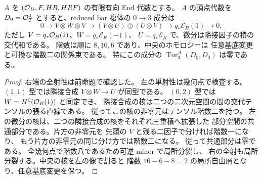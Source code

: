 \begin{proposition}[鉛筆窓の最長成分の関係束]
$A$ を $(\mathcal O_D,F,HR,HRF)$ の有限有向 End 代数とする。
$A$ の頂点代数を $D_0=\mathcal O_T^4$ とすると、reduced bar 複体の
$0\to3$ 成分は
\[
 0\longrightarrow V\otimes W\otimes V
 \longrightarrow (V\otimes U)\oplus(U\otimes V)
 \longrightarrow q_*\mathcal E_R(1)\longrightarrow0,
\]
ただし $V=q_*\mathcal O_B(1)$、$W=q_*\mathcal E_R(-1)$、
$U=q_*\mathcal E_R$ で、微分は隣接因子の積の交代和である。
階数は順に $8,16,6$ であり、中央のホモロジーは
任意基底変更と可換な階数二の関係束である。
特にこの成分の $\operatorname{Tor}^A_3(D_0,D_0)$ は零である。
\end{proposition}
\begin{proof}
右端の全射性は前命題で確認した。
左の単射性は幾何点で検査する。
$(1,1)$ 型では隣接合成 $V\otimes W\to U$ が同型である。
$(0,2)$ 型では $W=H^0(\mathcal O_B(1))$ と同定でき、
隣接合成の核は二つの二次元空間の間の交代テンソルの張る直線である。
従ってこの核の非零元はテンソル階数二を持つ。
左の微分の核は、二つの隣接合成の核をそれぞれ三重積へ拡張した
部分空間の共通部分である。片方の非零元を
先頭の $V$ と残る二因子で分ければ階数一になり、
もう片方の非零元の同じ分け方では階数二になる。
従って共通部分は零である。
全幾何点で階数八であるため可逆 minor で局所分裂し、
右の全射も局所分裂する。中央の核を左の像で割ると
階数 $16-6-8=2$ の局所自由層となり、任意基底変更を保つ。
\end{proof}

